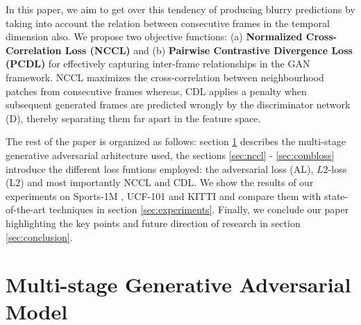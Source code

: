 \documentclass{article}
\begin{document}
  In this paper, we aim to get over this tendency of producing blurry predictions by taking into account the relation between consecutive frames in the temporal dimension also. We propose two objective functions: (a) \textbf{Normalized Cross-Correlation Loss (NCCL)} and (b) \textbf{Pairwise Contrastive Divergence Loss (PCDL)} for effectively capturing inter-frame relationships in the GAN framework.
  NCCL maximizes the cross-correlation between neighbourhood patches from consecutive frames whereas, CDL applies a penalty when subsequent generated frames are predicted wrongly by the discriminator network (D), thereby separating them far apart in the feature space. 
  
  The rest of the paper is organized as follows: section \ref{sec:model} describes the multi-stage generative adversarial arhitecture used, the sections \ref{sec:nccl} - \ref{sec:combloss} introduce the different loss funtions employed: the adversarial loss (AL), $ L2 $-loss (L2) and most importantly NCCL and CDL. We show the results of our experiments on Sports-1M \cite{KarpathyCVPR14}, UCF-101 \cite{soomro2012ucf101} and KITTI \cite{Geiger2013IJRR} and compare them with state-of-the-art techniques in section \ref{sec:experiments}. Finally, we conclude our paper highlighting the key points and future direction of research in section \ref{sec:conclusion}.

\section{Multi-stage Generative Adversarial Model}
  \label{sec:model}
  
\end{document}

